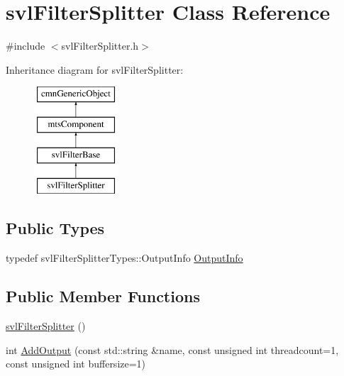 \hypertarget{classsvl_filter_splitter}{}\section{svl\+Filter\+Splitter Class Reference}
\label{classsvl_filter_splitter}


{\ttfamily \#include $<$svl\+Filter\+Splitter.\+h$>$}

Inheritance diagram for svl\+Filter\+Splitter\+:\begin{figure}[H]
\begin{center}
\leavevmode
\includegraphics[height=4.000000cm]{db/d8e/classsvl_filter_splitter}
\end{center}
\end{figure}
\subsection*{Public Types}
\begin{DoxyCompactItemize}
\item 
typedef svl\+Filter\+Splitter\+Types\+::\+Output\+Info \hyperlink{classsvl_filter_splitter_a21cb33e85d6f3ebafae8b753210a9ff9}{Output\+Info}
\end{DoxyCompactItemize}
\subsection*{Public Member Functions}
\begin{DoxyCompactItemize}
\item 
\hyperlink{classsvl_filter_splitter_a50e97bbd5a557965a57c9886db15e262}{svl\+Filter\+Splitter} ()
\item 
int \hyperlink{classsvl_filter_splitter_aed61ad571ff07d744e0252435620b10e}{Add\+Output} (const std\+::string \&name, const unsigned int threadcount=1, const unsigned int buffersize=1)
\end{DoxyCompactItemize}
